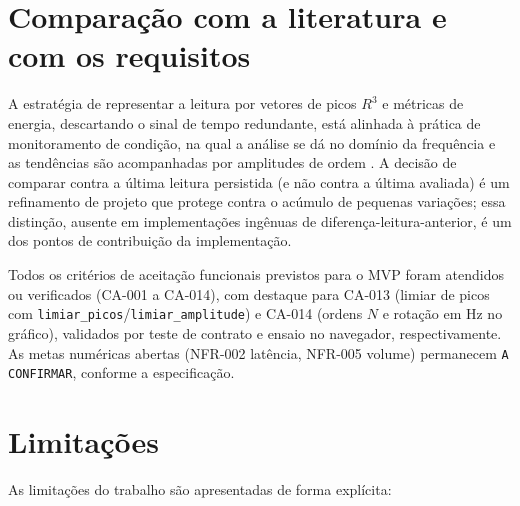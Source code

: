 \section{Comparação com a literatura e com os requisitos}

A estratégia de representar a leitura por vetores de picos \(R^3\) e métricas de
energia, descartando o sinal de tempo redundante, está alinhada à prática de
monitoramento de condição, na qual a análise se dá no domínio da frequência e
as tendências são acompanhadas por amplitudes de ordem \cite{scheffer2004}. A
decisão de comparar contra a última leitura persistida (e não contra a última
avaliada) é um refinamento de projeto que protege contra o acúmulo de pequenas
variações; essa distinção, ausente em implementações ingênuas de
diferença-leitura-anterior, é um dos pontos de contribuição da implementação.

Todos os critérios de aceitação funcionais previstos para o MVP foram
atendidos ou verificados (CA-001 a CA-014), com destaque para CA-013 (limiar de
picos com \texttt{limiar\_picos}/\texttt{limiar\_amplitude}) e CA-014 (ordens \(N\) e rotação em
Hz no gráfico), validados por teste de contrato e ensaio no navegador,
respectivamente. As metas numéricas abertas (NFR-002 latência, NFR-005 volume)
permanecem \texttt{A CONFIRMAR}, conforme a especificação.

\section{Limitações}

As limitações do trabalho são apresentadas de forma explícita:

